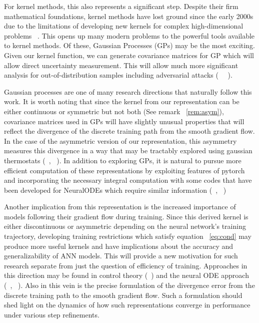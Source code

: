 For kernel methods, this also represents a significant step. Despite their firm mathematical foundations, kernel methods have lost ground since the early 2000s due to the limitations of developing new kernels for complex high-dimensional problems ~\cite{NIPS2005_663772ea}. This opens up many modern problems to the powerful tools available to kernel methods. Of these, Gaussian Processes (GPs) may be the most exciting. Given our kernel function, we can generate covariance matrices for GP which will allow direct uncertainty measurement. This will allow much more significant analysis for out-of-distribution samples including adversarial attacks (~\cite{szegedy2013intriguing} ~\cite{ilyas2019adversarial}). 

Gaussian processes are one of many research directions that naturally follow this work. It is worth noting that since the kernel from our representation can be either continuous or symmetric but not both (See remark ~\ref{rem:asym}), covariance matrices used in GPs will have slightly unusual properties that will reflect the divergence of the discrete training path from the smooth gradient flow. In the case of the asymmetric version of our representation, this asymmetry measures this divergence in a way that may be tractably explored using gaussian thermostats (~\cite{scherer2020kernel}, ~\cite{nose1990constant}). In addition to exploring GPs, it is natural to pursue more efficient computation of these representations by exploiting features of pytorch and incorporating the necessary integral computation with some codes that have been developed for NeuralODEs which require similar information (~\cite{bilovs2021neural}, ~\cite{neuralode2018})

Another implication from this representation is the increased importance of models following their gradient flow during training. Since this derived kernel is either discontinuous or asymmetric depending on the neural network's training trajectory, developing training restrictions which satisfy equation ~\ref{eq:cond} may produce more useful kernels and have implications about the accuracy and generalizability of ANN models. This will provide a new motivation for such research separate from just the question of efficiency of training. Approaches in this direction may be found in control theory (~\cite{lin2020gradient}) and the neural ODE approach (~\cite{bilovs2021neural}, ~\cite{neuralode2018}). Also in this vein is the precise formulation of the divergence error from the discrete training path to the smooth gradient flow. Such a formulation should shed light on the dynamics of how such representations converge in performance under various step refinements. 

